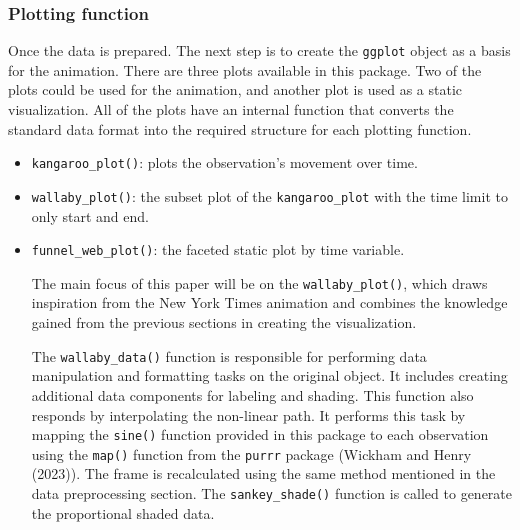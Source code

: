 \hypertarget{plotting-function}{%
\subsubsection{Plotting function}\label{plotting-function}}

Once the data is prepared. The next step is to create the \texttt{ggplot} object as a basis for the animation. There are three plots available in this package. Two of the plots could be used for the animation, and another plot is used as a static visualization. All of the plots have an internal function that converts the standard data format into the required structure for each plotting function.

\begin{itemize}
\item
  \texttt{kangaroo\_plot()}: plots the observation's movement over time.
\item
  \texttt{wallaby\_plot()}: the subset plot of the \texttt{kangaroo\_plot} with the time limit to only start and end.
\item
  \texttt{funnel\_web\_plot()}: the faceted static plot by time variable.

  The main focus of this paper will be on the \texttt{wallaby\_plot()}, which draws inspiration from the New York Times animation and combines the knowledge gained from the previous sections in creating the visualization.

  The \texttt{wallaby\_data()} function is responsible for performing data manipulation and formatting tasks on the original object. It includes creating additional data components for labeling and shading. This function also responds by interpolating the non-linear path. It performs this task by mapping the \texttt{sine()} function provided in this package to each observation using the \texttt{map()} function from the \texttt{purrr} package (Wickham and Henry (2023)). The frame is recalculated using the same method mentioned in the data preprocessing section. The \texttt{sankey\_shade()} function is called to generate the proportional shaded data.
\end{itemize}

